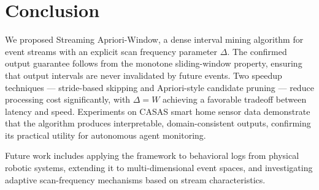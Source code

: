 \section{Conclusion}

We proposed Streaming Apriori-Window, a dense interval mining algorithm
for event streams with an explicit scan frequency parameter $\Delta$.
The confirmed output guarantee follows from the monotone sliding-window
property, ensuring that output intervals are never invalidated by
future events.
Two speedup techniques --- stride-based skipping and Apriori-style
candidate pruning --- reduce processing cost significantly,
with $\Delta = W$ achieving a favorable tradeoff between latency and speed.
Experiments on CASAS smart home sensor data demonstrate that the
algorithm produces interpretable, domain-consistent outputs,
confirming its practical utility for autonomous agent monitoring.

Future work includes applying the framework to behavioral logs from
physical robotic systems, extending it to multi-dimensional event spaces,
and investigating adaptive scan-frequency mechanisms based on
stream characteristics.
